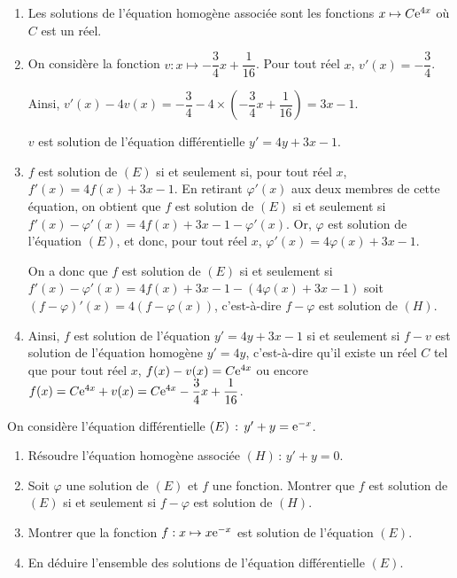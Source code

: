 \documentclass[11pt,fleqn, openany]{book} %
\begin{document}
\begin{solution}\hspace{0pt}

\begin{enumerate} 
\item Les solutions de l'équation homogène associée sont les fonctions \(x\mapsto C\mathrm{e}^{4x}\) où \(C\) est un réel.
\item On considère la fonction \(v:x\mapsto -\dfrac{3}{4}x+\dfrac{1}{16}\). Pour tout réel \(x\), \(v'(x)=-\dfrac{3}{4}\). 

Ainsi, $v'(x)-4v(x)=-\dfrac{3}{4}-4\times\left( -\dfrac{3}{4}x+\dfrac{1}{16}\right)=3x-1$.

\(v\) est solution de l'équation différentielle \(y'=4y+3x-1\).
\item \(f\) est solution de \((E)\) si et seulement si, pour tout réel \(x\), \(f'(x)=4f(x)+3x-1\). En retirant \(\varphi'(x)\) aux deux membres de cette équation, on obtient que \(f\) est solution de \((E)\) si et seulement si \(f'(x)-\varphi '(x)=4f(x)+3x-1-\varphi '(x)\). Or, \(\varphi\) est solution de l'équation \((E)\), et donc, pour tout réel \(x\), \(\varphi' (x) = 4\varphi (x)+3x-1\).

	On a donc que \(f\) est solution de \((E)\) si et seulement si \(f'(x)-\varphi '(x)=4f(x)+3x-1-(4\varphi (x)+3x-1)\) soit \((f-\varphi)'(x) = 4 (f-\varphi(x))\), c'est-à-dire \(f-\varphi\) est solution de \((H)\).
\item Ainsi, \(f\) est solution de l'équation \(y'=4y+3x-1\) si et seulement si \(f-v\) est solution de l'équation homogène \(y'=4y\), c'est-à-dire qu'il existe un réel \(C\) tel que pour tout réel \(x\), \(f(x)-v(x)=C\mathrm{e}^{4x}\) ou encore \(f(x)=C\mathrm{e}^{4x}+v(x)=C\mathrm{e}^{4x}-\dfrac{3}{4}x+\dfrac{1}{16}\).
\end{enumerate}
 \end{solution}



\begin{exercise}[topic=diff03]On considère l'équation différentielle $(E)\, :\, y'+y=\mathrm{e}^{-x }$.
\begin{enumerate}
\item Résoudre l'équation homogène associée $(H)\,:\, y'+y=0$.
\item Soit $\varphi$ une solution de $(E)$ et $f$ une fonction. Montrer que $f$ est solution de $(E)$ si et seulement si $f-\varphi$ est solution de $(H)$.
\item Montrer que la fonction $f:x\mapsto x\mathrm{e}^{-x}$ est solution de l'équation $(E)$.
\item En déduire l'ensemble des solutions de l'équation différentielle $(E)$.
\end{enumerate}\end{exercise}
\end{document}
